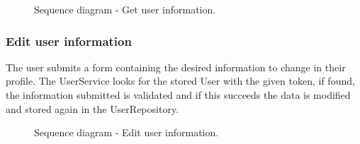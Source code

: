 \begin{figure}[H]
    \centering
    \caption{\label{fig:sequence-user-information}Sequence diagram - Get user information.}
\end{figure}

\subsubsection{Edit user information}
The user submits a form containing the desired information to change in their profile. The UserService looks for the stored User with the given token, if found, the information submitted is validated and if this succeeds the data is modified and stored again in the UserRepository.

\begin{figure}[H]
    \centering
    \caption{\label{fig:sequence-user-information}Sequence diagram - Edit user information.}
\end{figure}


